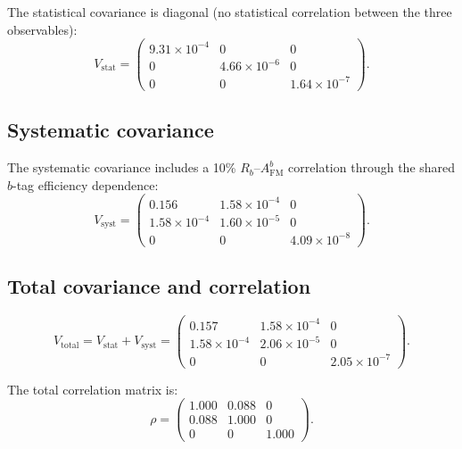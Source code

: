 \documentclass[11pt,a4paper]{article}
\begin{document}
The statistical covariance is diagonal (no statistical correlation between the three
observables):
\begin{equation}
V_\mathrm{stat} = \begin{pmatrix}
9.31 \times 10^{-4} & 0 & 0 \\
0 & 4.66 \times 10^{-6} & 0 \\
0 & 0 & 1.64 \times 10^{-7}
\end{pmatrix}.
\label{eq:stat_cov}
\end{equation}

\subsection{Systematic covariance}

The systematic covariance includes a 10\% $R_b$--$A_\mathrm{FM}^b$ correlation through
the shared $b$-tag efficiency dependence:
\begin{equation}
V_\mathrm{syst} = \begin{pmatrix}
0.156 & 1.58 \times 10^{-4} & 0 \\
1.58 \times 10^{-4} & 1.60 \times 10^{-5} & 0 \\
0 & 0 & 4.09 \times 10^{-8}
\end{pmatrix}.
\label{eq:syst_cov}
\end{equation}

\subsection{Total covariance and correlation}

\begin{equation}
V_\mathrm{total} = V_\mathrm{stat} + V_\mathrm{syst} = \begin{pmatrix}
0.157 & 1.58 \times 10^{-4} & 0 \\
1.58 \times 10^{-4} & 2.06 \times 10^{-5} & 0 \\
0 & 0 & 2.05 \times 10^{-7}
\end{pmatrix}.
\label{eq:total_cov}
\end{equation}

The total correlation matrix is:
\begin{equation}
\rho = \begin{pmatrix}
1.000 & 0.088 & 0 \\
0.088 & 1.000 & 0 \\
0 & 0 & 1.000
\end{pmatrix}.
\label{eq:correlation}
\end{equation}
\end{document}

